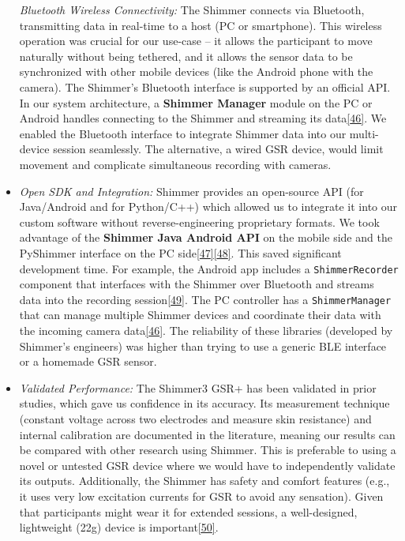 \documentclass[12pt,a4paper]{article}
\begin{document}
\begin{itemize}
  \emph{Bluetooth Wireless Connectivity:} The Shimmer connects via Bluetooth, transmitting data in real-time to a host (PC or smartphone). This wireless operation was crucial for our use-case -- it allows the participant to move naturally without being tethered, and it allows the sensor data to be synchronized with other mobile devices (like the Android phone with the camera). The Shimmer's Bluetooth interface is supported by an official API. In our system architecture, a \textbf{Shimmer Manager} module on the PC or Android handles connecting to the Shimmer and streaming its data\href{https://github.com/buccancs/bucika_gsr/blob/7048f7f6a7536f5cd577ed2184800d3dad97fd08/docs/architecture.md\#L66-L70}{{[}46{]}}. We enabled the Bluetooth interface to integrate Shimmer data into our multi-device session seamlessly. The alternative, a wired GSR device, would limit movement and complicate simultaneous recording with cameras.
\item
  \emph{Open SDK and Integration:} Shimmer provides an open-source API (for Java/Android and for Python/C++) which allowed us to integrate it into our custom software without reverse-engineering proprietary formats. We took advantage of the \textbf{Shimmer Java Android API} on the mobile side and the PyShimmer interface on the PC side\href{https://github.com/buccancs/bucika_gsr/blob/7048f7f6a7536f5cd577ed2184800d3dad97fd08/scripts/monitor_vendor_sdks.py\#L18-L27}{{[}47{]}}\href{https://github.com/buccancs/bucika_gsr/blob/7048f7f6a7536f5cd577ed2184800d3dad97fd08/PythonApp/shimmer_manager.py\#L19-L27}{{[}48{]}}. This saved significant development time. For example, the Android app includes a \passthrough{\lstinline!ShimmerRecorder!} component that interfaces with the Shimmer over Bluetooth and streams data into the recording session\href{https://github.com/buccancs/bucika_gsr/blob/7048f7f6a7536f5cd577ed2184800d3dad97fd08/docs/architecture.md\#L126-L134}{{[}49{]}}. The PC controller has a \passthrough{\lstinline!ShimmerManager!} that can manage multiple Shimmer devices and coordinate their data with the incoming camera data\href{https://github.com/buccancs/bucika_gsr/blob/7048f7f6a7536f5cd577ed2184800d3dad97fd08/docs/architecture.md\#L66-L70}{{[}46{]}}. The reliability of these libraries (developed by Shimmer's engineers) was higher than trying to use a generic BLE interface or a homemade GSR sensor.
\item
  \emph{Validated Performance:} The Shimmer3 GSR+ has been validated in prior studies, which gave us confidence in its accuracy. Its measurement technique (constant voltage across two electrodes and measure skin resistance) and internal calibration are documented in the literature, meaning our results can be compared with other research using Shimmer. This is preferable to using a novel or untested GSR device where we would have to independently validate its outputs. Additionally, the Shimmer has safety and comfort features (e.g., it uses very low excitation currents for GSR to avoid any sensation). Given that participants might wear it for extended sessions, a well-designed, lightweight (22g) device is important\href{https://github.com/buccancs/gsr_rgbt_project/blob/ea44d0298e0379541f112f76eb809976f3771fa3/docs/hardware.md\#L128-L133}{{[}50{]}}.

\end{itemize}
\end{document}
